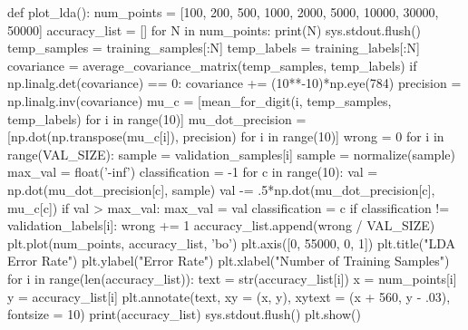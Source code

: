 \documentclass{article}
\begin{document}
\begin{python}
def plot_lda():
    num_points = [100, 200, 500, 1000, 2000, 5000, 10000, 30000, 50000]
    accuracy_list = []
    for N in num_points:
        print(N)
        sys.stdout.flush()
        temp_samples = training_samples[:N]
        temp_labels = training_labels[:N]
        covariance = average_covariance_matrix(temp_samples, temp_labels)
        if np.linalg.det(covariance) == 0:
            covariance += (10**-10)*np.eye(784)
        precision = np.linalg.inv(covariance)
        mu_c = [mean_for_digit(i, temp_samples, temp_labels) for i in range(10)]
        mu_dot_precision = [np.dot(np.transpose(mu_c[i]), precision) for i in range(10)]
        wrong = 0
        for i in range(VAL_SIZE):
            sample = validation_samples[i]
            sample = normalize(sample)
            max_val = float('-inf')
            classification = -1
            for c in range(10):
                val = np.dot(mu_dot_precision[c], sample)
                val -= .5*np.dot(mu_dot_precision[c], mu_c[c])
                if val > max_val:
                    max_val = val
                    classification = c
            if classification != validation_labels[i]:
                wrong += 1
        accuracy_list.append(wrong / VAL_SIZE)
    plt.plot(num_points, accuracy_list, 'bo')
    plt.axis([0, 55000, 0, 1])
    plt.title("LDA Error Rate")
    plt.ylabel("Error Rate")
    plt.xlabel("Number of Training Samples")
    for i in range(len(accuracy_list)):
        text = str(accuracy_list[i])
        x = num_points[i]
        y = accuracy_list[i]
        plt.annotate(text, xy = (x, y), xytext = (x + 560, y - .03), fontsize = 10)
    print(accuracy_list)
    sys.stdout.flush()
    plt.show()


\end{python}
\end{document}

